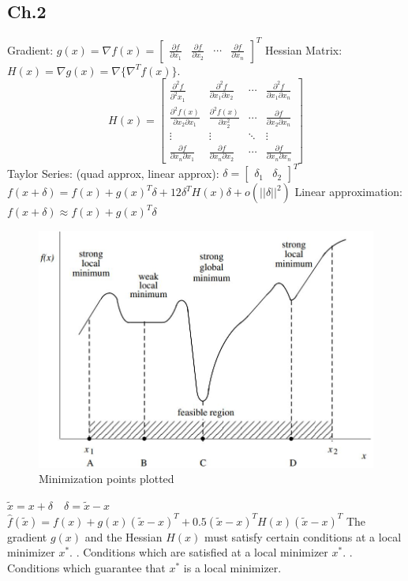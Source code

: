 \begin{multicols}{3}
\section{Ch.2}
Gradient: $g(x)=\nabla f(x)=\begin{bmatrix}\frac{\partial f}{\partial x_1} & \frac{\partial f}{\partial x_2} & \cdots & \frac{\partial f}{\partial x_n} \end{bmatrix}^T$ \newline
Hessian Matrix: $H(x)=\nabla g(x)=\nabla \{ \nabla^T f(x)\}$. \newline
\[
H(x)=
\begin{bmatrix}
\frac{\partial^2 f}{\partial^2 x_1} & \frac{\partial^2 f}{\partial x_1 \partial x_2} & \cdots & \frac{\partial^2 f}{\partial x_1 \partial x_n} \\
\frac{\partial^2 f(x)}{\partial x_2 \partial x_1} & \frac{\partial^2 f(x)}{\partial x_2^2} & \cdots & \frac{\partial f}{\partial x_2 \partial x_n} \\
\vdots & \vdots & \ddots & \vdots \\
\frac{\partial  f}{\partial x_n \partial x_1}& \frac{\partial f}{\partial x_n \partial x_2}& \cdots & \frac{\partial f}{\partial x_n \partial x_n}
\end{bmatrix}
\]
Taylor Series: (quad approx, linear approx): $\delta =\begin{bmatrix} \delta_1 &\delta_2 \end{bmatrix}^T$
$f(x + \delta) = f(x) + g(x)^T\delta + 12\delta^TH(x)\delta + o(||\delta||^2)$ \newline
Linear approximation: $f(x + \delta) \approx f(x) + g(x)^T\delta $
\begin{figure}
	\centering
	\includegraphics[width=\linewidth]{Images/min.jpg}
	\caption{Minimization points plotted}
\end{figure}
$\tilde{x}=x+\delta \quad \delta =\tilde{x}-x$ $\hat{f}(\tilde{x})=f(x)+g(x)(\tilde{x}-x)^T+0.5(\tilde{x}-x)^T H(x)(\tilde{x}-x)^T$
The gradient $g(x)$ and the Hessian $H(x)$ must satisfy certain conditions at a
local minimizer $x^*$.  . Conditions which are satisfied at a local minimizer $x^*$.  . Conditions which guarantee that $x^*$ is a local minimizer. 


\end{multicols}
